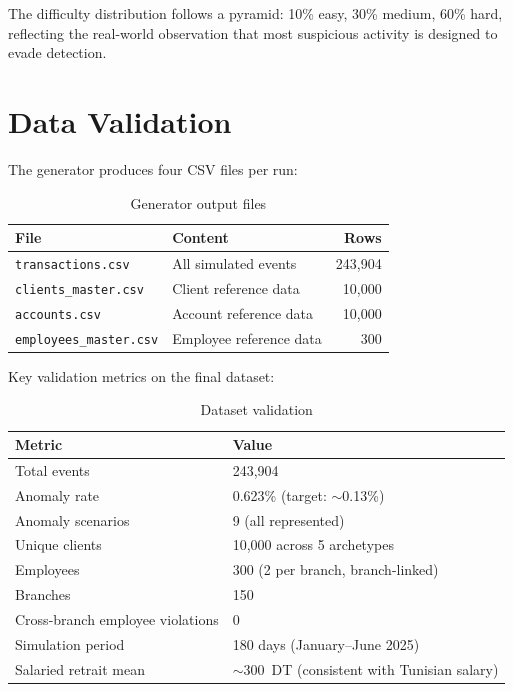 The difficulty distribution follows a pyramid: 10\% easy, 30\% medium, 60\% hard,
reflecting the real-world observation that most suspicious activity is designed
to evade detection.

\section{Data Validation}

The generator produces four CSV files per run:

\begin{table}[H]
\centering
\caption{Generator output files}
\label{tab:generator-output}
\begin{tabular}{@{}llr@{}}
\toprule
\textbf{File} & \textbf{Content} & \textbf{Rows} \\
\midrule
\texttt{transactions.csv}      & All simulated events      & 243,904 \\
\texttt{clients\_master.csv}   & Client reference data     & 10,000 \\
\texttt{accounts.csv}          & Account reference data    & 10,000 \\
\texttt{employees\_master.csv} & Employee reference data   & 300 \\
\bottomrule
\end{tabular}
\end{table}

Key validation metrics on the final dataset:

\begin{table}[H]
\centering
\caption{Dataset validation}
\label{tab:data-validation}
\begin{tabular}{@{}ll@{}}
\toprule
\textbf{Metric} & \textbf{Value} \\
\midrule
Total events         & 243,904 \\
Anomaly rate         & 0.623\% (target: $\sim$0.13\%) \\
Anomaly scenarios    & 9 (all represented) \\
Unique clients       & 10,000 across 5 archetypes \\
Employees            & 300 (2 per branch, branch-linked) \\
Branches             & 150 \\
Cross-branch employee violations & 0 \\
Simulation period    & 180 days (January--June 2025) \\
Salaried retrait mean & $\sim$300~DT (consistent with Tunisian salary) \\
\bottomrule
\end{tabular}
\end{table}

